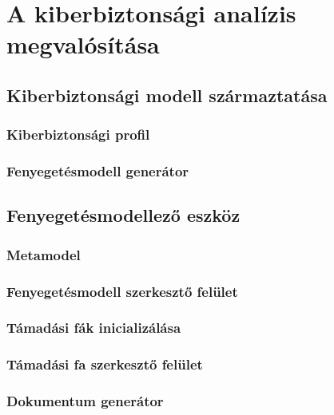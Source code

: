 \chapter{A kiberbiztonsági analízis megvalósítása}
\section{Kiberbiztonsági modell származtatása}

\subsection{Kiberbiztonsági profil}

\subsection{Fenyegetésmodell generátor}

\section{Fenyegetésmodellező eszköz}

\subsection{Metamodel}

\subsection{Fenyegetésmodell szerkesztő felület}

\subsection{Támadási fák inicializálása}

\subsection{Támadási fa szerkesztő felület}

\subsection{Dokumentum generátor}